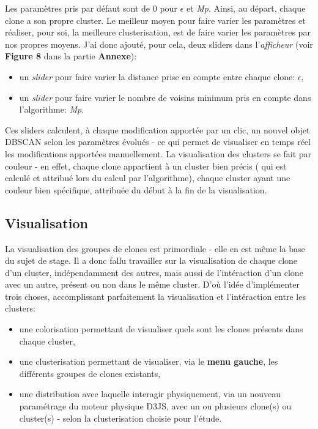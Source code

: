 \documentclass[pdftex,12pt,a4paper]{report}
\begin{document}
\begin{spacing}{1.2}
Les paramètres pris par défaut sont de 0 pour $\epsilon$ et \textit{Mp}. Ainsi, au départ, chaque clone a son propre cluster.
\newline
Le meilleur moyen pour faire varier les paramètres et réaliser, pour soi, la meilleure clusterisation, est de faire varier les paramètres par nos propres moyens.
\newline
J'ai donc ajouté, pour cela, deux sliders dans l'\textit{afficheur} (voir \textbf{Figure 8} dans la partie \textbf{Annexe}):
	\begin{itemize}
	\item{un \textit{slider} pour faire varier la distance prise en compte entre chaque clone: $\epsilon$,}
	\item{un \textit{slider} pour faire varier le nombre de voisins minimum pris en compte dans l'algorithme: \textit{Mp}.}
	\end{itemize}
Ces sliders calculent, à chaque modification apportée par un clic, un nouvel objet DBSCAN selon les paramètres évolués - ce qui permet de visualiser en temps réel les modifications apportées manuellement.
\newline
La visualisation des clusters se fait par couleur - en effet, chaque clone appartient à un cluster bien précis ( qui est calculé et attribué lors du calcul par l'algorithme), chaque cluster ayant une couleur bien spécifique, attribuée du début à la fin de la visualisation.

\subsection{Visualisation}

La visualisation des groupes de clones est primordiale - elle en est même la base du sujet de stage.
\newline
Il a donc fallu travailler sur la visualisation de chaque clone d'un cluster, indépendamment des autres, mais aussi de l'intéraction d'un clone avec un autre, présent ou non dans le même cluster.
\newline
D'où l'idée d'implémenter trois choses, accomplissant parfaitement la visualisation et l'intéraction entre les clusters:
	\begin{itemize}
	\item{une colorisation permettant de visualiser quels sont les clones présents dans chaque cluster,}
	\item{une clusterisation permettant de visualiser, via le \textbf{menu gauche}, les différents groupes de clones existants,}
	\item{une distribution avec laquelle interagir physiquement, via un nouveau paramétrage du moteur physique D3JS, avec un ou plusieurs clone(s) ou cluster(s) - selon la clusterisation choisie pour l'étude.}
	\end{itemize}


\end{spacing}
\end{document}

